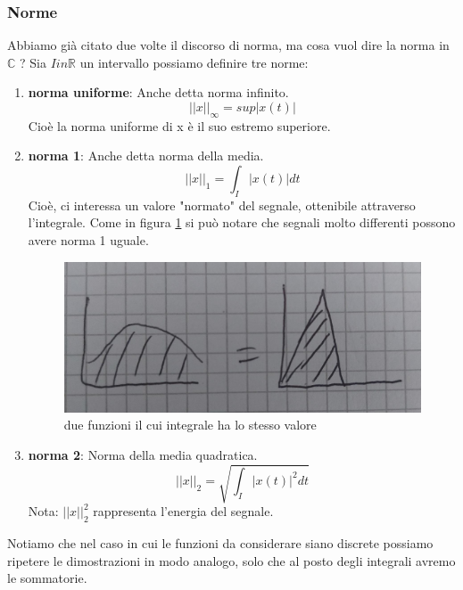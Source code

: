\documentclass[a4paper]{article}
\newcommand{\R}[0]{\mathbb{R}}
\newcommand{\C}[0]{\mathbb{C}}
\begin{document}
\subsubsection{Norme}
\label{section:norme}
Abbiamo già citato due volte il discorso di norma, ma cosa vuol dire la norma in $\C$ ?
Sia $I in \R $ un intervallo possiamo definire tre norme: 
\begin{enumerate}
	\item \textbf{norma uniforme}: Anche detta norma infinito.
		$$ ||x||_{\infty} = sup|x(t)|$$
		Cioè la norma uniforme di x è il suo estremo superiore.
	\item \textbf{norma 1}: Anche detta norma della media.
		$$ ||x||_1 = \int_I |x(t)| dt$$
		Cioè, ci interessa un valore "normato" del segnale, ottenibile attraverso l'integrale.
		Come in figura \ref{img:norma1_uguale} si può notare che segnali molto differenti possono avere norma 1 uguale.
		\begin{figure}[h]
			\includegraphics[width=\textwidth]{norma1_uguale.jpeg}
			\caption{due funzioni il cui integrale ha lo stesso valore}
			\label{img:norma1_uguale}
		\end{figure}
	\item \textbf{norma 2}: Norma della media quadratica.
		$$ ||x||_2 = \sqrt{\int_I |x(t)|^2 dt}$$
		Nota: $||x||_2^2$ rappresenta l'energia del segnale.  
\end{enumerate}
Notiamo che nel caso in cui le funzioni da considerare siano discrete possiamo ripetere le dimostrazioni in modo analogo, solo che al posto degli integrali avremo le sommatorie.
\end{document}
